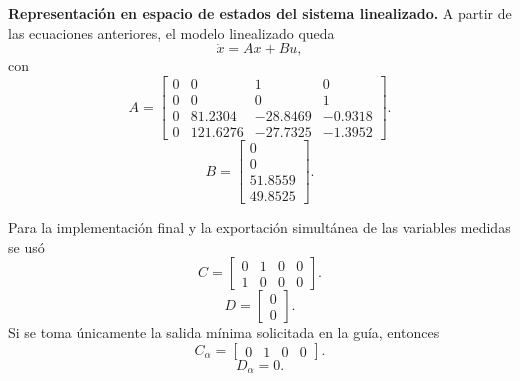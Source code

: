 \documentclass[conference]{IEEEtran}
\begin{document}
\noindent
\textbf{Representaci\'on en espacio de estados del sistema linealizado.} A partir de las ecuaciones anteriores, el modelo linealizado queda
\begin{equation}
\dot{x}=Ax+Bu,
\end{equation}
con
\begin{equation}
A=
\begin{bmatrix}
0 & 0 & 1 & 0\\
0 & 0 & 0 & 1\\
0 & 81.2304 & -28.8469 & -0.9318\\
0 & 121.6276 & -27.7325 & -1.3952
\end{bmatrix}.
\end{equation}
\begin{equation}
B=
\begin{bmatrix}
0\\
0\\
51.8559\\
49.8525
\end{bmatrix}.
\end{equation}

Para la implementaci\'on final y la exportaci\'on simult\'anea de las variables medidas se us\'o
\begin{equation}
C=
\begin{bmatrix}
0 & 1 & 0 & 0\\
1 & 0 & 0 & 0
\end{bmatrix}.
\end{equation}
\begin{equation}
D=
\begin{bmatrix}
0\\
0
\end{bmatrix}.
\end{equation}
\noindent
Si se toma \'unicamente la salida m\'inima solicitada en la gu\'ia, entonces
\begin{equation}
C_{\alpha}=
\begin{bmatrix}
0 & 1 & 0 & 0
\end{bmatrix}.
\end{equation}
\begin{equation}
D_{\alpha}=0.
\end{equation}
\end{document}
